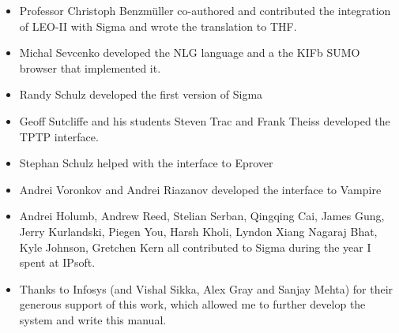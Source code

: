 \documentclass{book}
\begin{document}
\begin{itemize}

\item Professor Christoph Benzmüller co-authored \cite{pb10} and contributed
the integration of LEO-II with Sigma and wrote the translation to THF.

\item Michal Sevcenko developed the NLG language and a the KIFb SUMO browser that 
implemented it.

\item Randy Schulz developed the first version of Sigma

\item Geoff Sutcliffe and his students Steven Trac and Frank Theiss developed the TPTP
interface.

\item Stephan Schulz helped with the interface to Eprover

\item Andrei Voronkov and Andrei Riazanov developed the interface to Vampire

\item Andrei Holumb, Andrew Reed, Stelian Serban, Qingqing Cai, James Gung, Jerry
Kurlandski, Piegen You, Harsh Kholi, Lyndon Xiang Nagaraj Bhat, Kyle Johnson,
Gretchen Kern all contributed to Sigma during the year I spent at IPsoft.

\item Thanks to Infosys (and Vishal Sikka, Alex Gray and Sanjay Mehta) for their
generous support of this work, which allowed me to further develop the system
and write this manual.

\end{itemize}






\newpage
\label{classindex}
\printindex[classes] %
\printindex
\end{document}
